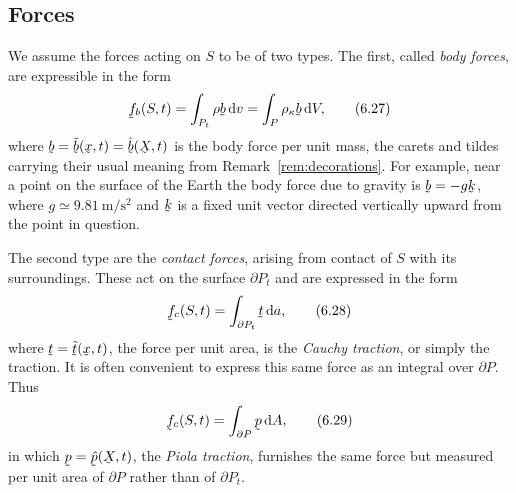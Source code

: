 \subsection{Forces}\label{sec:ch6forces}

We assume the forces acting on $S$ to be of two types. The first,
called \emph{body forces}, are expressible in the form
\begin{equation}
   \vek{f}_{b}(S,t)=\int_{P_{t}}\rho\bb\,\dl v
   =\int_{P}\rho_{\kappa}\bb\,\dl V ,
   \tag{6.27}\label{eq:6.27}
\end{equation}
where $\bb=\tilde\bb(\bx,t)=\hat\bb(\bX,t)$ is the body force per unit
mass, the carets and tildes carrying their usual meaning from
Remark~\ref{rem:decorations}. For example, near a point on the surface
of the Earth the body force due to gravity is $\bb=-g\bk$, where
$g\simeq9.81\ \mathrm{m/s^{2}}$ and $\bk$ is a fixed unit vector
directed vertically upward from the point in question.

The second type are the \emph{contact forces}, arising from contact of
$S$ with its surroundings. These act on the surface $\partial P_{t}$
and are expressed in the form
\begin{equation}
   \vek{f}_{c}(S,t)=\int_{\partial P_{t}}\bt\,\dl a ,
   \tag{6.28}\label{eq:6.28}
\end{equation}
where $\bt=\tilde\bt(\bx,t)$, the force per unit area, is the
\emph{Cauchy traction}, or simply the traction. It is often convenient
to express this same force as an integral over $\partial P$. Thus
\begin{equation}
   \vek{f}_{c}(S,t)=\int_{\partial P}\bp\,\dl A ,
   \tag{6.29}\label{eq:6.29}
\end{equation}
in which $\bp=\hat\bp(\bX,t)$, the \emph{Piola traction}, furnishes the
same force but measured per unit area of $\partial P$ rather than of
$\partial P_{t}$.

